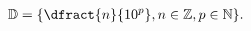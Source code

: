 \documentclass[preview]{standalone}
\begin{document}
\begin{align*}
\mathbb{D} = \{\dfract{n}{10^p},n \in \mathbb{Z},p \in \mathbb{N}\}.
\end{align*}
\end{document}
